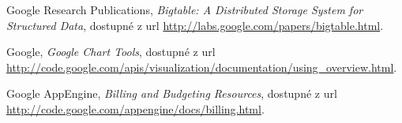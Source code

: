 \documentclass[bc,male,java,dept456]{diploma}						%
\begin{document}
\begin{thebibliography}{99}
 Google Research Publications,
\textit{Bigtable: A Distributed Storage System for Structured Data}, dostupné z url \url{http://labs.google.com/papers/bigtable.html}.


 Google,
\textit{Google Chart Tools}, dostupné z url \url{http://code.google.com/apis/visualization/documentation/using_overview.html}.

 Google AppEngine,
\textit{Billing and Budgeting Resources}, dostupné z url \url{http://code.google.com/appengine/docs/billing.html}.





\end{thebibliography}


\end{document}
